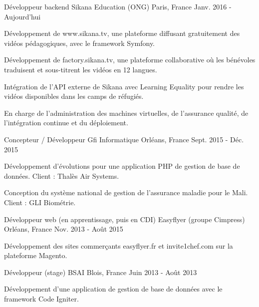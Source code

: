 \begin{cventries}
  \cventry
    {Développeur backend}
    {Sikana Education (ONG)}
    {Paris, France}
    {Janv. 2016 - Aujourd'hui}
    {
      \begin{cvitems}
        \item {Développement de www.sikana.tv, une plateforme diffusant gratuitement des vidéos pédagogiques, avec le framework Symfony.}
        \item {Développement de factory.sikana.tv, une plateforme collaborative où les bénévoles traduisent et sous-titrent les vidéos en 12 langues.}
        \item {Intégration de l'API externe de Sikana avec Learning Equality pour rendre les vidéos disponibles dans les camps de réfugiés.}
        \item {En charge de l'administration des machines virtuelles, de l'assurance qualité, de l'intégration continue et du déploiement.}
      \end{cvitems}
    }
  \cventry
    {Concepteur / Développeur}
    {Gfi Informatique}
    {Orléans, France}
    {Sept. 2015 - Déc. 2015}
    {
      \begin{cvitems}
        \item {Développement d'évolutions pour une application PHP de gestion de base de données. Client : Thalès Air Systems.}
        \item {Conception du système national de gestion de l'assurance maladie pour le Mali. Client : GLI Biométrie.}
      \end{cvitems}
    }
  \cventry
    {Développeur web (en apprentissage, puis en CDI)}
    {Easyflyer (groupe Cimpress)}
    {Orléans, France}
    {Nov. 2013 - Août 2015}
    {
      \begin{cvitems}
        \item {Développement des sites commerçants easyflyer.fr et invite1chef.com sur la plateforme Magento.}
      \end{cvitems}
    }
  \cventry
    {Développeur (stage)}
    {BSAI}
    {Blois, France}
    {Juin 2013 - Août 2013}
    {
      \begin{cvitems}
        \item {Développement d'une application de gestion de base de données avec le framework Code Igniter.}
      \end{cvitems}
    }
\end{cventries}

